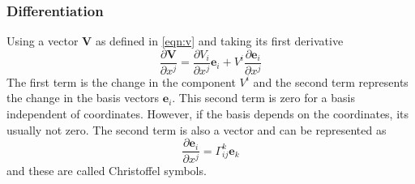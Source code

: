 \subsubsection{Differentiation}
Using a vector $\bm V$ as defined in \eqref{eqn:v} and taking its first derivative
\begin{equation}
\frac{\partial \bm V}{\partial x^j}=\frac{\partial V_i}{\partial x^j}\bm e_i+V^i\frac{\partial \bm e_i}{\partial x^j}
\end{equation}
The first term is the change in the component $V^i$ and the second term represents the change in the basis vectors $\bm e_i$. This second term is zero for a basis independent of coordinates. However, if the basis depends on the coordinates, its usually not zero. The second term is also a vector and can be represented as
\begin{equation}
\frac{\partial \bm e_i}{\partial x^j}=\Gamma^k_{ij}\bm e_k
\end{equation}
and these are called Christoffel symbols.